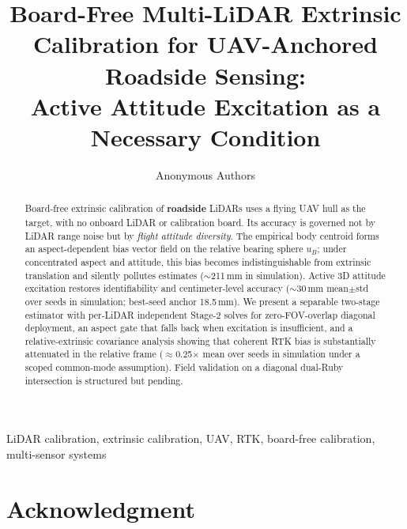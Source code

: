 \documentclass[conference]{IEEEtran}
\begin{document}
\title{Board-Free Multi-LiDAR Extrinsic Calibration for UAV-Anchored Roadside Sensing:\\
Active Attitude Excitation as a Necessary Condition}

\author{Anonymous Authors}

\maketitle

\begin{abstract}
Board-free extrinsic calibration of \textbf{roadside} LiDARs uses a flying UAV hull
as the target, with no onboard LiDAR or calibration board.
Its accuracy is governed not by LiDAR range noise but by \emph{flight attitude
diversity}.
The empirical body centroid forms an aspect-dependent bias vector field on the
relative bearing sphere $u_B$; under concentrated aspect and attitude, this bias
becomes indistinguishable from extrinsic translation and silently pollutes estimates
($\sim$211\,mm in simulation).
Active 3D attitude excitation restores identifiability and centimeter-level accuracy
($\sim$30\,mm mean$\pm$std over seeds in simulation; best-seed anchor 18.5\,mm).
We present a separable two-stage estimator with per-LiDAR independent Stage-2 solves
for zero-FOV-overlap diagonal deployment, an aspect gate that falls back when
excitation is insufficient, and a relative-extrinsic covariance analysis showing that
coherent RTK bias is substantially attenuated in the relative frame ($\approx$0.25$\times$
mean over seeds in simulation under a scoped common-mode assumption).
Field validation on a diagonal dual-Ruby intersection is structured but pending.
\end{abstract}

\begin{IEEEkeywords}
LiDAR calibration, extrinsic calibration, UAV, RTK, board-free calibration, multi-sensor systems
\end{IEEEkeywords}










\section*{Acknowledgment}



\end{document}
